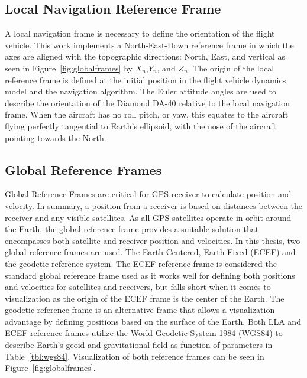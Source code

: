 \subsection{Local Navigation Reference Frame}
A local navigation frame is necessary to define the orientation of the flight vehicle. This work implements a North-East-Down reference frame in which the axes are aligned with the topographic directions: North, East, and vertical as seen in Figure~\ref{fig:globalframes} by \(X_n\),\(Y_n\), and \(Z_n\). The origin of the local reference frame is defined at the initial position in the flight vehicle dynamics model and the navigation algorithm. The Euler attitude angles are used to describe the orientation of the Diamond DA-40 relative to the local navigation frame. When the aircraft has no roll pitch, or yaw, this equates to the aircraft flying perfectly tangential to Earth's ellipsoid, with the nose of the aircraft pointing towards the North.

\subsection{Global Reference Frames}
Global Reference Frames are critical for GPS receiver to calculate position and velocity. In summary, a position from a receiver is based on distances between the receiver and any visible satellites. As all GPS satellites operate in orbit around the Earth, the global reference frame provides a suitable solution that encompasses both satellite and receiver position and velocities. In this thesis, two global reference frames are used. The Earth-Centered, Earth-Fixed (ECEF) and the geodetic reference system. The ECEF reference frame is considered the standard global reference frame used as it works well for defining both positions and velocities for satellites and receivers, but falls short when it comes to visualization as the origin of the ECEF frame is the center of the Earth. The geodetic reference frame is an alternative frame that allows a visualization advantage by defining positions based on the surface of the Earth. Both LLA and ECEF reference frames utilize the World Geodetic System 1984 (WGS84) to describe Earth's geoid and gravitational field as function of parameters in Table~\ref{tbl:wgs84}. Visualization of both reference frames can be seen in Figure~\ref{fig:globalframes}.


